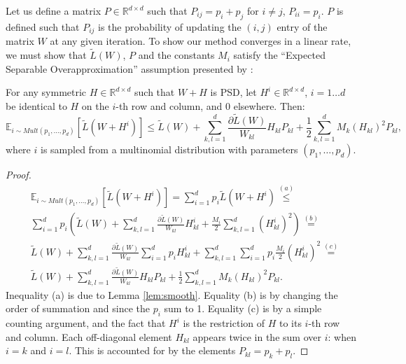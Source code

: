 \documentclass[twoside,11pt]{article}
\newcommand\mat[1]{{#1}}
\newcommand{\W}{\mat{W}}
\newcommand{\Hh}{\mat{H}}
\newcommand{\Pp}{\mat{P}}
\newcommand{\R}{\mathbb{R}}
\newcommand{\tL}{\tilde{L}(\W)}
\newcommand{\grdkl}{\frac{\partial \tL}{\W_{kl}}}
\begin{document}
Let us define a matrix $\Pp \in \R^{d \times d}$ such that $\Pp_{ij} = p_i + p_j$ for $i \ne j$, $\Pp_{ii} = p_i$. $\Pp$ is defined such that $\Pp_{ij}$ is the probability of updating the $(i,j)$ entry of the matrix $\W$ at any given iteration. To show our method converges in a linear rate, we must show that $\tL$, $\Pp$ and the constants $M_i$ satisfy the ``Expected Separable Overapproximation'' assumption presented by \citet{richtarik2013optimal}:

\begin{lemma}\label{lem:ESO}
For any symmetric $\Hh \in \R^{d \times d}$ such that $\W + \Hh$ is PSD, let $\Hh^i \in \R^{d \times d}$, $i=1 \ldots d$ be identical to $\Hh$ on the $i$-th row and column, and $0$ elsewhere. Then:
\begin{equation}
\mathbb{E}_{i \sim Mult(p_1, \ldots, p_d)} \left[ \tilde{L}(\W + \Hh^i) \right] \leq 
\tL + \sum_{k,l=1}^d  \grdkl \Hh_{kl} \Pp_{kl} + \frac{1}{2} \sum_{k,l=1}^d   M_k (\Hh_{kl})^2 \Pp_{kl},
\end{equation}
where $i$ is sampled from a multinomial distribution with parameters $(p_1, \ldots , p_d)$.
\end{lemma}

\begin{proof}%
\begin{align*}
    &\mathbb{E}_{i \sim Mult(p_1, \ldots, p_d)} \left[ \tilde{L}(\W + \Hh^i) \right] =\sum_{i=1}^d p_i \tilde{L}(\W + \Hh^i) \stackrel{(a)}{\leq} \\
    & \sum_{i=1}^d p_i \left(\tL + \sum_{k,l=1}^d \grdkl \Hh_{kl}^i + \frac{M_i}{2} \sum_{k,l=1}^d  (\Hh_{kl}^i)^2 \right) \stackrel{(b)}{=} \\
    & \tL + \sum_{k,l=1}^d \grdkl \sum_{i=1}^d  p_i \Hh_{kl}^i + \sum_{k,l=1}^d  \sum_{i=1}^d  p_i \frac{M_i}{2} (\Hh_{kl}^i)^2  \stackrel{(c)}{=} \\
    & \tL + \sum_{k,l=1}^d \grdkl \Hh_{kl} \Pp_{kl} + \frac{1}{2} \sum_{k,l=1}^d M_k (\Hh_{kl})^2 \Pp_{kl}.
\end{align*}
Inequality (a) is due to Lemma \ref{lem:smooth}. Equality (b) is by changing the order of summation and since the $p_i$ sum to 1. Equality (c) is by a simple counting argument, and the fact that $\Hh^i$ is the restriction of $\Hh$ to its $i$-th row and column. Each off-diagonal element $\Hh_{kl}$ appears twice in the sum over $i$: when $i=k$ and $i=l$. This is accounted for by the elements $\Pp_{kl} = p_k + p_l$.
\end{proof}
\end{document}
